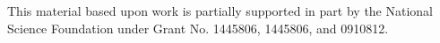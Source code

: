 \documentclass{sig-alternate-05-2015}
\begin{document}
This material based upon work is partially supported in part by the National Science Foundation under Grant No. 1445806, 1445806, and 0910812.


\begin{scriptsize} 
 
% 

\end{scriptsize}
   
 
\end{document}
